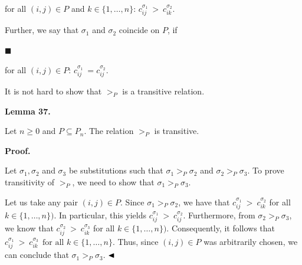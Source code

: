 \documentclass[10pt,a4paper]{amsart}
\begin{document}
for all $(i,j)\in P$ and $k\in\{1,\ldots,n\}$: $c^{\sigma_{1}}_{ij}\ >\ c^{\sigma_{2}}_{ik}$.\par
 
 
  
Further, we say that $\sigma_{1}$ and $\sigma_{2}$ coincide on $P$, if\par
  
\par\noindent  $\blacksquare$ 
 
for all $(i,j)\in P$: $c^{\sigma_{1}}_{ij}\ =c^{\sigma_{2}}_{ij}$.\par
 
 
  
 
 
 
It is not hard to show that $>_{P}$ is a transitive relation.\par
 
 
 
\par\medskip\noindent\textbf{Lemma 37.}\par
 
 
Let $n\geq 0$ and $P\subseteq P_{n}$. The relation $>_{P}$ is transitive.\par
 
 
 
 
\par\medskip\noindent\textbf{Proof.}\par
 
 
Let $\sigma_{1},\sigma_{2}$ and $\sigma_{3}$ be substitutions such that $\sigma_{1}>_{P}\sigma_{2}$ and $\sigma_{2}>_{P}\sigma_{3}$. To prove transitivity of $>_{P}$, we need to show that $\sigma_{1}>_{P}\sigma_{3}$.\par
 
 
 
Let us take any pair $(i,j)\in P$. Since $\sigma_{1}>_{P}\sigma_{2}$, we have that $c^{\sigma_{1}}_{ij}\ >\ c^{\sigma_{2}}_{ik}$ for all $k\in\{1,\ldots,n\})$. In particular, this yields $c^{\sigma_{1}}_{ij}\ >\ c^{\sigma_{2}}_{ij}$. Furthermore, from $\sigma_{2}>_{P}\sigma_{3}$, we know that $c^{\sigma_{2}}_{ij}\ >\ c^{\sigma_{3}}_{ik}$ for all $k\in\{1,\ldots,n\})$. Consequently, it follows that $c^{\sigma_{1}}_{ij}\ >\ c^{\sigma_{3}}_{ik}\ \ \mbox{for all }k\in\{1,\ldots,n\}.$ Thus, since $(i,j)\in P$ was arbitrarily chosen, we can conclude that $\sigma_{1}>_{P}\sigma_{3}$. $\hfill\blacktriangleleft$\par
 
\end{document}
